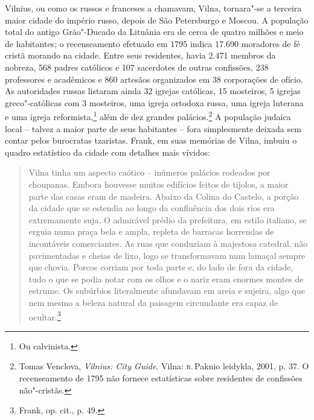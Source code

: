 Vilnius, ou como os russos e franceses a chamavam, Vilna, tornara"-se a
terceira maior cidade do império russo, depois de São Petersburgo e
Moscou. A população total do antigo Grão"-Ducado da Lituânia era de
cerca de quatro milhões e meio de habitantes; o recenseamento efetuado
em 1795 indica 17.690 moradores de fé cristã morando na cidade. Entre
seus residentes, havia 2.471 membros da nobreza, 568 padres católicos e
107 sacerdotes de outras confissões, 238 professores e acadêmicos e 860
artesãos organizados em 38 corporações de ofício. As autoridades russas
listaram ainda 32 igrejas católicas, 15 mosteiros, 5 igrejas
greco"-católicas com 3 mosteiros, uma igreja ortodoxa russa, uma igreja
luterana e uma igreja reformista,\footnote{Ou calvinista.} além de dez grandes
palácios.\footnote{Tomas Venclova, \textit{Vilnius: City Guide}. Vilna: \textsc{r}.\,Paknio leidykla, 2001, p. 37. O recenseamento de 1795 não fornece estatísticas sobre residentes de confissões não"-cristãs.} A população judaica local -- talvez a maior parte de seus habitantes -- fora
simplesmente deixada sem contar pelos burocratas tzaristas. Frank, em
suas memórias de Vilna, imbuiu o quadro estatístico da cidade com
detalhes mais vívidos:

\begin{quote}
Vilna tinha um aspecto caótico -- inúmeros palácios rodeados por
choupanas. Embora houvesse muitos edifícios feitos de tijolos, a maior
parte das casas eram de madeira. Abaixo da Colina do Castelo, a porção
da cidade que se estendia ao longo da confluência dos dois rios era
extremamente suja. O admirável prédio da prefeitura, em estilo italiano,
se erguia numa praça bela e ampla, repleta de barracas horrendas de
incontáveis comerciantes. As ruas que conduziam à majestosa catedral,
não pavimentadas e cheias de lixo, logo se transformavam num lamaçal
sempre que chovia. Porcos corriam por toda parte e, do lado de fora da
cidade, tudo o que se podia notar com os olhos e o nariz eram enormes
montes de estrume. Os subúrbios literalmente afundavam em areia e
sujeira, algo que nem mesmo a beleza natural da paisagem circundante era
capaz de ocultar.\footnote{Frank, op. cit., p. 49.}
\end{quote}

